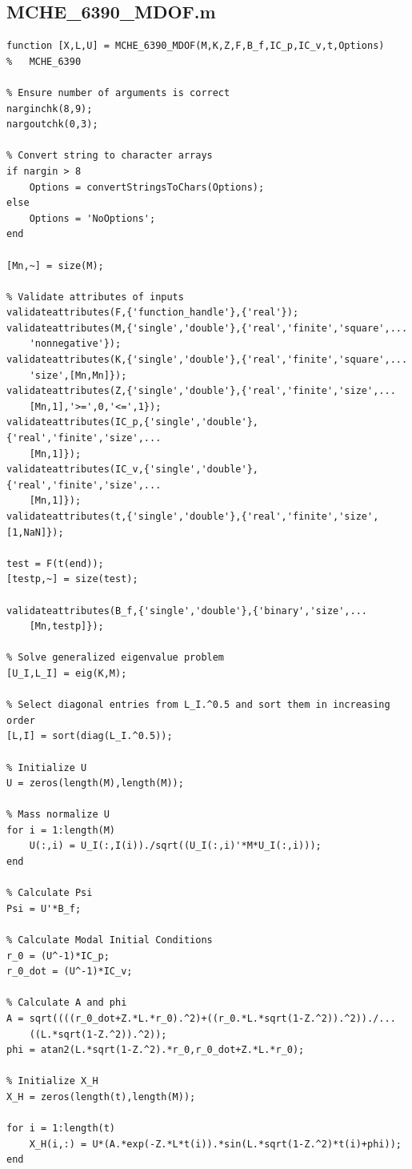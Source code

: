 \documentclass{article}
\begin{document}
\subsection*{MCHE\_6390\_MDOF.m}
\begin{lstlisting}[style=Matlab-editor]
function [X,L,U] = MCHE_6390_MDOF(M,K,Z,F,B_f,IC_p,IC_v,t,Options)
%   MCHE_6390

% Ensure number of arguments is correct
narginchk(8,9);
nargoutchk(0,3);

% Convert string to character arrays
if nargin > 8
    Options = convertStringsToChars(Options);
else
    Options = 'NoOptions';
end

[Mn,~] = size(M);

% Validate attributes of inputs
validateattributes(F,{'function_handle'},{'real'});
validateattributes(M,{'single','double'},{'real','finite','square',...
    'nonnegative'});
validateattributes(K,{'single','double'},{'real','finite','square',...
    'size',[Mn,Mn]});
validateattributes(Z,{'single','double'},{'real','finite','size',...
    [Mn,1],'>=',0,'<=',1});
validateattributes(IC_p,{'single','double'},{'real','finite','size',...
    [Mn,1]});
validateattributes(IC_v,{'single','double'},{'real','finite','size',...
    [Mn,1]});
validateattributes(t,{'single','double'},{'real','finite','size',[1,NaN]});

test = F(t(end));
[testp,~] = size(test);

validateattributes(B_f,{'single','double'},{'binary','size',...
    [Mn,testp]});

% Solve generalized eigenvalue problem
[U_I,L_I] = eig(K,M);

% Select diagonal entries from L_I.^0.5 and sort them in increasing order
[L,I] = sort(diag(L_I.^0.5));

% Initialize U
U = zeros(length(M),length(M));

% Mass normalize U
for i = 1:length(M)
    U(:,i) = U_I(:,I(i))./sqrt((U_I(:,i)'*M*U_I(:,i)));
end

% Calculate Psi
Psi = U'*B_f;

% Calculate Modal Initial Conditions
r_0 = (U^-1)*IC_p;
r_0_dot = (U^-1)*IC_v;

% Calculate A and phi
A = sqrt((((r_0_dot+Z.*L.*r_0).^2)+((r_0.*L.*sqrt(1-Z.^2)).^2))./...
    ((L.*sqrt(1-Z.^2)).^2));
phi = atan2(L.*sqrt(1-Z.^2).*r_0,r_0_dot+Z.*L.*r_0);

% Initialize X_H
X_H = zeros(length(t),length(M));

for i = 1:length(t)
    X_H(i,:) = U*(A.*exp(-Z.*L*t(i)).*sin(L.*sqrt(1-Z.^2)*t(i)+phi));
end


\end{lstlisting}
\end{document}
